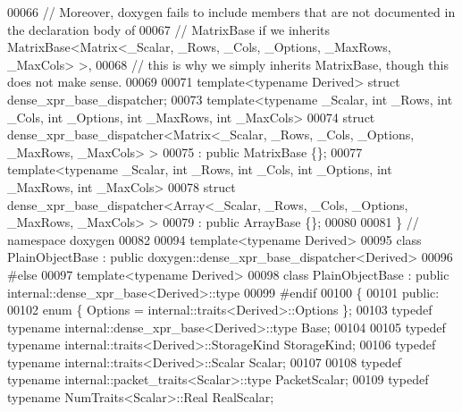 \begin{DoxyCode}
00066 \textcolor{comment}{// Moreover, doxygen fails to include members that are not documented in the declaration body of}
00067 \textcolor{comment}{// MatrixBase if we inherits MatrixBase<Matrix<\_Scalar, \_Rows, \_Cols, \_Options, \_MaxRows, \_MaxCols> >,}
00068 \textcolor{comment}{// this is why we simply inherits MatrixBase, though this does not make sense.}
00069 
00071 \textcolor{keyword}{template}<\textcolor{keyword}{typename} Derived> \textcolor{keyword}{struct }dense\_xpr\_base\_dispatcher;
00073 \textcolor{keyword}{template}<\textcolor{keyword}{typename} \_Scalar, \textcolor{keywordtype}{int} \_Rows, \textcolor{keywordtype}{int} \_Cols, \textcolor{keywordtype}{int} \_Options, \textcolor{keywordtype}{int} \_MaxRows, \textcolor{keywordtype}{int} \_MaxCols>
00074 \textcolor{keyword}{struct }dense\_xpr\_base\_dispatcher<Matrix<\_Scalar, \_Rows, \_Cols, \_Options, \_MaxRows, \_MaxCols> >
00075     : \textcolor{keyword}{public} MatrixBase \{\};
00077 \textcolor{keyword}{template}<\textcolor{keyword}{typename} \_Scalar, \textcolor{keywordtype}{int} \_Rows, \textcolor{keywordtype}{int} \_Cols, \textcolor{keywordtype}{int} \_Options, \textcolor{keywordtype}{int} \_MaxRows, \textcolor{keywordtype}{int} \_MaxCols>
00078 \textcolor{keyword}{struct }dense\_xpr\_base\_dispatcher<Array<\_Scalar, \_Rows, \_Cols, \_Options, \_MaxRows, \_MaxCols> >
00079     : \textcolor{keyword}{public} ArrayBase \{\};
00080 
00081 \} \textcolor{comment}{// namespace doxygen}
00082 
00094 \textcolor{keyword}{template}<\textcolor{keyword}{typename} Derived>
00095 \textcolor{keyword}{class }PlainObjectBase : \textcolor{keyword}{public} doxygen::dense\_xpr\_base\_dispatcher<Derived>
00096 \textcolor{preprocessor}{#else}
00097 template<typename Derived>
00098 class PlainObjectBase : \textcolor{keyword}{public} internal::dense\_xpr\_base<Derived>::type
00099 \textcolor{preprocessor}{#endif}
00100 \{
00101   \textcolor{keyword}{public}:
00102     \textcolor{keyword}{enum} \{ Options = internal::traits<Derived>::Options \};
00103     \textcolor{keyword}{typedef} \textcolor{keyword}{typename} internal::dense\_xpr\_base<Derived>::type Base;
00104 
00105     \textcolor{keyword}{typedef} \textcolor{keyword}{typename} internal::traits<Derived>::StorageKind StorageKind;
00106     \textcolor{keyword}{typedef} \textcolor{keyword}{typename} internal::traits<Derived>::Scalar Scalar;
00107     
00108     \textcolor{keyword}{typedef} \textcolor{keyword}{typename} internal::packet\_traits<Scalar>::type PacketScalar;
00109     \textcolor{keyword}{typedef} \textcolor{keyword}{typename} NumTraits<Scalar>::Real RealScalar;

\end{DoxyCode}

